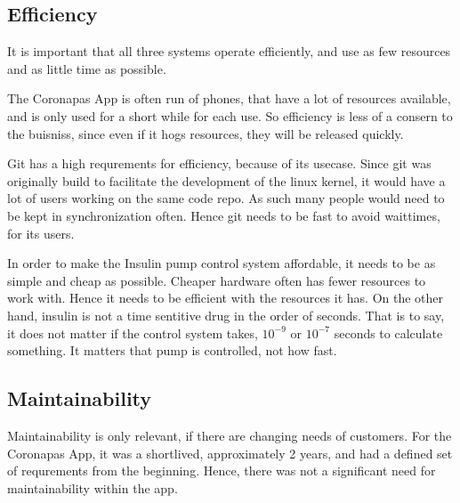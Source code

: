 

\subsection{Efficiency}
It is important that all three systems operate efficiently, and use as few resources and as little time as possible.

The Coronapas App is often run of phones, that have a lot of resources available, and is only used for a short while for each use.
So efficiency is less of a consern to the buisniss, since even if it hogs resources, they will be released quickly.


Git has a high requrements for efficiency, because of its usecase.
Since git was originally build to facilitate the development of the linux kernel, it would have a lot of users working on the same code repo.
As such many people would need to be kept in synchronization often.
Hence git needs to be fast to avoid waittimes, for its users.

In order to make the Insulin pump control system affordable, it needs to be as simple and cheap as possible.
Cheaper hardware often has fewer resources to work with.
Hence it needs to be efficient with the resources it has.
On the other hand, insulin is not a time sentitive drug in the order of seconds.
That is to say, it does not matter if the control system takes, $10^{-9}$ or $10^{-7}$ seconds to calculate something.
It matters that pump is controlled, not how fast.



\subsection{Maintainability}
Maintainability is only relevant, if there are changing needs of customers.
For the Coronapas App, it was a shortlived, approximately 2 years, and had a defined set of requrements from the beginning.
Hence, there was not a significant need for maintainability within the app.

